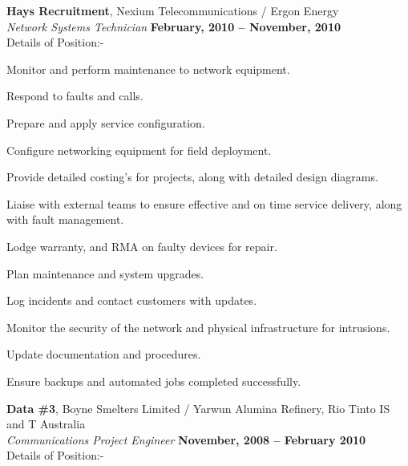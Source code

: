 \documentclass[margin,line]{resume}
\begin{document}
\begin{resume}
    {\bf Hays Recruitment}, Nexium Telecommunications / Ergon Energy  \vspace{2mm}\\\vspace{1mm}%
        {\sl Network Systems Technician} \hfill {\bf February, 2010 -- November, 2010}\\   
             Details of Position:-
                  \begin{list2}
                          \vspace*{1mm}
                          \item Monitor and perform maintenance to network equipment.
                          \item Respond to faults and calls.
                          \item Prepare and apply service configuration.
                          \item Configure networking equipment for field deployment.
                          \item Provide detailed costing's for projects, along with detailed design diagrams.
                          \item Liaise with external teams to ensure effective and on time service delivery, along with fault management. 
                          \item Lodge warranty, and RMA on faulty devices for repair.
                          \item Plan maintenance and system upgrades.
                          \item Log incidents and contact customers with updates.
                          \item Monitor the security of the network and physical infrastructure for intrusions.
                          \item Update documentation and procedures. 
                          \item Ensure backups and automated jobs completed successfully.
                          \end{list2}
    {\bf Data \#3}, Boyne Smelters Limited / Yarwun Alumina Refinery, Rio Tinto IS and T Australia \vspace{2mm}\\\vspace{1mm}%
    {\sl Communications Project Engineer} \hfill {\bf November, 2008 -- February 2010}\\
    Details of Position:-
    \begin{list2}

\end{list2}
\end{resume}
\end{document}
